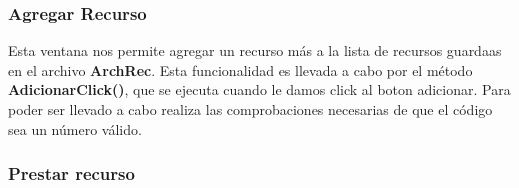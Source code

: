 \documentclass[12pt]{article}
\begin{document}
  
\subsubsection{Agregar Recurso}


Esta ventana nos permite agregar un recurso más a la lista de recursos guardaas en el archivo \textbf{ArchRec}.  Esta funcionalidad es llevada a cabo por el método \textbf{AdicionarClick()}, que se ejecuta cuando le damos click al boton adicionar.  Para poder ser llevado a cabo realiza las comprobaciones necesarias de que el código sea un número válido.  

\subsubsection{Prestar recurso}

\end{document}
